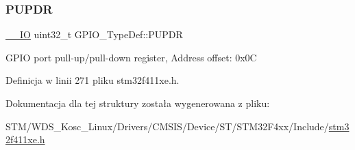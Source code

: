 \subsubsection{\texorpdfstring{P\+U\+P\+DR}{PUPDR}}
{\footnotesize\ttfamily \hyperlink{core__sc300_8h_aec43007d9998a0a0e01faede4133d6be}{\+\_\+\+\_\+\+IO} uint32\+\_\+t G\+P\+I\+O\+\_\+\+Type\+Def\+::\+P\+U\+P\+DR}

G\+P\+IO port pull-\/up/pull-\/down register, Address offset\+: 0x0C 

Definicja w linii 271 pliku stm32f411xe.\+h.



Dokumentacja dla tej struktury została wygenerowana z pliku\+:\begin{DoxyCompactItemize}
\item 
S\+T\+M/\+W\+D\+S\+\_\+\+Kosc\+\_\+\+Linux/\+Drivers/\+C\+M\+S\+I\+S/\+Device/\+S\+T/\+S\+T\+M32\+F4xx/\+Include/\hyperlink{stm32f411xe_8h}{stm32f411xe.\+h}\end{DoxyCompactItemize}
